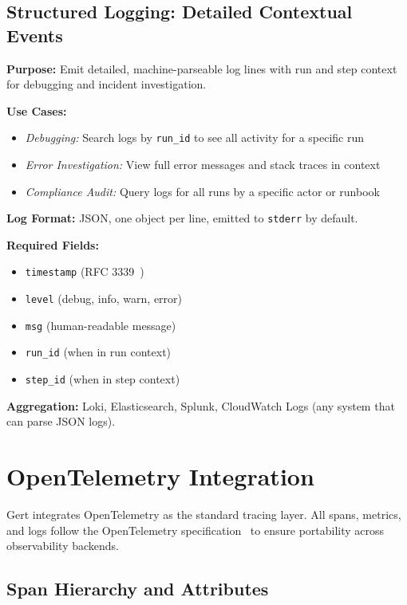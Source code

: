 \subsection{Structured Logging: Detailed Contextual Events}

\textbf{Purpose:} Emit detailed, machine-parseable log lines with run and step context for debugging and incident investigation.

\textbf{Use Cases:}
\begin{itemize}
  \item \textit{Debugging:} Search logs by \texttt{run\_id} to see all activity for a specific run
  \item \textit{Error Investigation:} View full error messages and stack traces in context
  \item \textit{Compliance Audit:} Query logs for all runs by a specific actor or runbook
\end{itemize}

\textbf{Log Format:} JSON, one object per line, emitted to \texttt{stderr} by default.

\textbf{Required Fields:}
\begin{itemize}
  \item \texttt{timestamp} (RFC 3339~\cite{rfc3339})
  \item \texttt{level} (debug, info, warn, error)
  \item \texttt{msg} (human-readable message)
  \item \texttt{run\_id} (when in run context)
  \item \texttt{step\_id} (when in step context)
\end{itemize}

\textbf{Aggregation:} Loki, Elasticsearch, Splunk, CloudWatch Logs (any system that can parse JSON logs).

\section{OpenTelemetry Integration}

Gert integrates OpenTelemetry as the standard tracing layer. All spans, metrics, and logs follow the OpenTelemetry specification~\cite{otel-spec} to ensure portability across observability backends.

\subsection{Span Hierarchy and Attributes}

